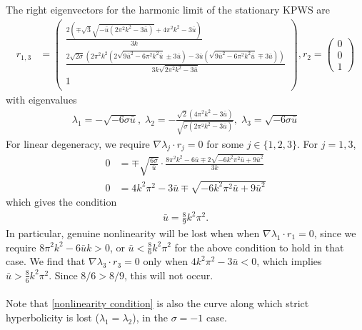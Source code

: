 \documentclass[12pt]{article}
\numberwithin{equation}{section}
\begin{document}
The right eigenvectors for the harmonic limit of the stationary KPWS are 
\begin{align}
    r_{1,3} &= \left(
\begin{array}{c}
 \frac{2 \left(\mp\sqrt{3} \sqrt{- \bar u \left(2 \pi ^2 k^2-3 \bar u\right)}+4 \pi ^2 k^2-3 \bar u\right)}{3 k} \\
  \frac{2 \sqrt{2\sigma} \left(2 \pi ^2 k^2 \left(2 \sqrt{9 \bar u^2-6 \pi ^2 k^2 \bar u}\pm3 \bar u\right)-3 \bar u
   \left(\sqrt{9 \bar u^2-6 \pi ^2 k^2 \bar u}\mp3 \bar u\right)\right)}{3 k \sqrt{2 \pi ^2 k^2-3 \bar u}} \\
   1 \\
\end{array}
\right), r_2 = \left(\begin{array}{c}
     0 \\
     0 \\
     1 
\end{array}\right)
\end{align}
with eigenvalues
\begin{align}
    \lambda_{1} = -\sqrt{-6\sigma \bar u}, \; \lambda_2 = -\frac{\sqrt{2} \left(4 \pi ^2 k^2-3
   \bar u\right)}{ \sqrt{\sigma(2 \pi ^2 k^2-3 \bar u)}}, \; \lambda_3 = \sqrt{-6\sigma \bar u}
\end{align}
For linear degeneracy, we require $\nabla \lambda_j \cdot r_j = 0 $ for some $j \in \{1,2,3\}$. For $j = 1,3$,
\begin{align*}
    0 &= \mp \sqrt{\frac{6\sigma}{\bar u}}\cdot \frac{8\pi^2k^2-6\bar u \mp 2\sqrt{-6k^2\pi^2\bar u + 9 \bar u ^2}}{3k} \\
     0 &= 4k^2\pi^2-3\bar u \mp \sqrt{-6k^2\pi^2\bar u + 9 \bar u ^2}
\end{align*}
which gives the condition 
\begin{align}
    \bar u = \frac{8}{9}k^2 \pi ^2. \label{nonlinearity condition}
\end{align}
In particular, genuine nonlinearity will be lost when when $\nabla\lambda_1 \cdot r_1 = 0$, since we require $8\pi^2k^2-6\bar u k>0$, or $\bar u < \frac{8}{6}k^2\pi^2$ for the above condition to hold in that case. We find that $\nabla\lambda_3 \cdot r_3 = 0$ only when $4k^2\pi^2-3\bar u <0$, which implies $\bar u > \frac{8}{6}k^2\pi^2$. Since $8/6>8/9$, this will not occur.\\
\\
Note that \eqref{nonlinearity condition} is also the curve along which strict hyperbolicity is lost ($\lambda_1=\lambda_2$), in the $\sigma = -1$ case.
\end{document}

